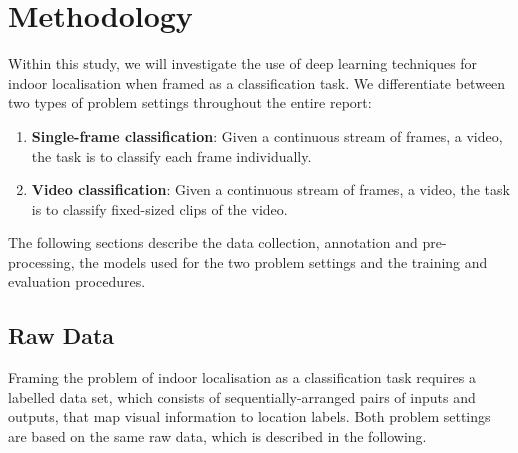 \documentclass[a4paper]{article}
\begin{document}


  

  \section{Methodology} %
  \label{sec:methodology}

  Within this study, we will investigate the use of deep learning techniques for
  indoor localisation when framed as a classification task. We differentiate
  between two types of problem settings throughout the entire report:

  \begin{enumerate}

    \item \textbf{Single-frame classification}: Given a continuous stream of
      frames, a video, the task is to classify each frame individually.

    \item \textbf{Video classification}: Given a continuous stream of frames, a
      video, the task is to classify fixed-sized clips of the video.

  \end{enumerate}


  The following sections describe the data collection, annotation and
  pre-processing, the models used for the two problem settings and the training
  and evaluation procedures.
  
  \subsection{Raw Data} %
  \label{sub:raw-data}

  Framing the problem of indoor localisation as a classification task requires a
  labelled data set, which consists of sequentially-arranged pairs of inputs and
  outputs, that map visual information to location labels. Both problem settings
  are based on the same raw data, which is described in the following.
\end{document}
